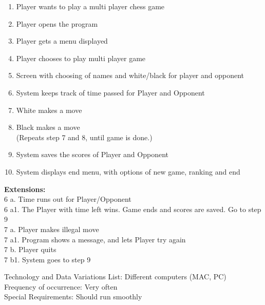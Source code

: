 \documentclass{article}
\begin{document}
\begin{flushleft}
\begin{enumerate}
	\item	 Player wants to play a multi player chess game
	\item 	 Player opens the program
	\item 	 Player gets a menu displayed
	\item 	 Player chooses to play multi player game
	\item 	 Screen with choosing of names and white/black for player and opponent
	\item 	 System keeps track of time passed for Player and Opponent
	\item 	White makes a move
	\item	Black makes a move\\
	(Repeats step 7 and 8, until game is done.)
	\item 	System saves the scores of Player and Opponent
	\item 	System displays end menu, with options of new game, ranking and end
	
\end{enumerate}
	
	\textbf{Extensions:} \\
	
\hspace{5mm} 6 a. Time runs out for Player/Opponent\\
\hspace{5mm} 6 a1. The Player with time left wins. Game ends and scores are saved. Go to step 9\\
\hspace{5mm} 7 a. Player makes illegal move\\
\hspace{5mm} 7 a1. Program shows a message, and lets Player try again\\
\hspace{5mm} 7 b. Player quits\\
\hspace{5mm} 7 b1. System goes to step 9\\
\vspace{3mm}

Technology and Data Variations List:\hspace{3mm} Different computers (MAC, PC)\\
Frequency of occurrence:\hspace{3mm} Very often\\
Special Requirements:\hspace{3mm} Should run smoothly\\


\end{flushleft}
\end{document}
